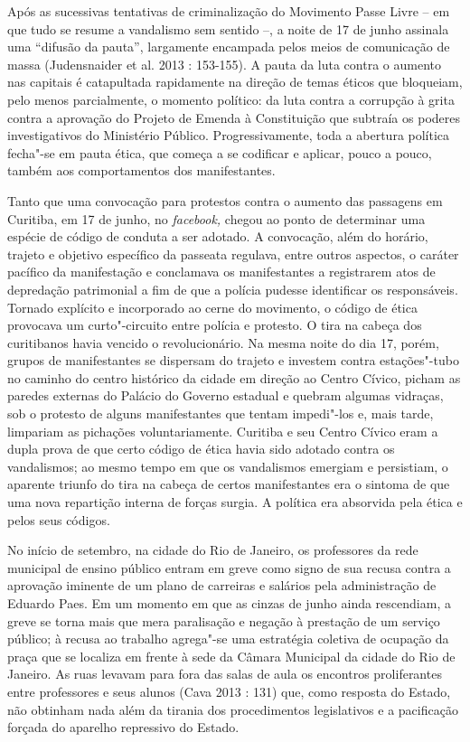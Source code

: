 Após as sucessivas tentativas de
criminalização do Movimento Passe Livre -- em que tudo se resume a
vandalismo sem sentido --, a noite de 17 de junho assinala uma ``difusão
da pauta'', largamente encampada pelos meios de comunicação de massa
(Judensnaider et al. 2013 : 153-155). A pauta da luta contra o aumento
nas capitais é catapultada rapidamente na direção de temas éticos que
bloqueiam, pelo menos parcialmente, o momento político: da luta contra a
corrupção à grita contra a aprovação do Projeto de Emenda à Constituição
que subtraía os poderes investigativos do Ministério Público.
Progressivamente, toda a abertura política fecha"-se em pauta ética, que
começa a se codificar e aplicar, pouco a pouco, também aos
comportamentos dos manifestantes.

Tanto que uma convocação para protestos contra o aumento das passagens
em Curitiba, em 17 de junho, no \emph{facebook,} chegou ao ponto de
determinar uma espécie de código de conduta a ser adotado. A convocação,
além do horário, trajeto e objetivo específico da passeata regulava,
entre outros aspectos, o caráter pacífico da manifestação e conclamava
os manifestantes a registrarem atos de depredação patrimonial a fim de
que a polícia pudesse identificar os responsáveis. Tornado explícito e
incorporado ao cerne do movimento, o código de ética provocava um
curto"-circuito entre polícia e protesto. O tira na cabeça dos
curitibanos havia vencido o revolucionário. Na mesma noite do dia 17,
porém, grupos de manifestantes se dispersam do trajeto e investem contra
estações"-tubo no caminho do centro histórico da cidade em direção ao
Centro Cívico, picham as paredes externas do Palácio do Governo estadual
e quebram algumas vidraças, sob o protesto de alguns manifestantes que
tentam impedi"-los e, mais tarde, limpariam as pichações voluntariamente.
Curitiba e seu Centro Cívico eram a dupla prova de que certo código de
ética havia sido adotado contra os vandalismos; ao mesmo tempo em que os
vandalismos emergiam e persistiam, o aparente triunfo do tira na cabeça
de certos manifestantes era o sintoma de que uma nova repartição interna
de forças surgia. A política era absorvida pela ética e pelos seus
códigos.

No início de setembro, na cidade do Rio de Janeiro, os professores da
rede municipal de ensino público entram em greve como signo de sua
recusa contra a aprovação iminente de um plano de carreiras e salários
pela administração de Eduardo Paes. Em um momento em que as cinzas de
junho ainda rescendiam, a greve se torna mais que mera paralisação e
negação à prestação de um serviço público; à recusa ao trabalho
agrega"-se uma estratégia coletiva de ocupação da praça que se localiza
em frente à sede da Câmara Municipal da cidade do Rio de Janeiro. As
ruas levavam para fora das salas de aula os encontros proliferantes
entre professores e seus alunos (Cava 2013 : 131) que, como resposta do
Estado, não obtinham nada além da tirania dos procedimentos legislativos
e a pacificação forçada do aparelho repressivo do Estado.

